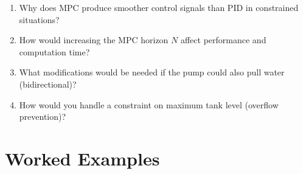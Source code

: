 \begin{enumerate}
    \item Why does MPC produce smoother control signals than PID in constrained situations?
    \item How would increasing the MPC horizon $N$ affect performance and computation time?
    \item What modifications would be needed if the pump could also pull water (bidirectional)?
    \item How would you handle a constraint on maximum tank level (overflow prevention)?
\end{enumerate}

\section{Worked Examples}
\label{sec:examples}

